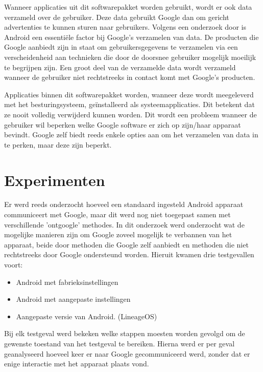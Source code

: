 \documentclass[a0,portrait]{a0poster}
\begin{document}
\begin{multicols}{2}
Wanneer applicaties uit dit softwarepakket worden gebruikt, wordt er ook data verzameld over de gebruiker. Deze data gebruikt Google dan om gericht advertenties te kunnen sturen naar gebruikers. Volgens een onderzoek door \cite{schmidt_google-data-collection} is Android een essentiële factor bij Google's verzamelen van data. De producten die Google aanbiedt zijn in staat om gebruikersgegevens te verzamelen via een verscheidenheid aan technieken die door de doorsnee gebruiker mogelijk moeilijk te begrijpen zijn. Een groot deel van de verzamelde data wordt verzameld wanneer de gebruiker niet rechtstreeks in contact komt met Google's producten. 

Applicaties binnen dit softwarepakket worden, wanneer deze wordt meegeleverd met het besturingsysteem, geïnstalleerd als systeemapplicaties. Dit betekent dat ze nooit volledig verwijderd kunnen worden. Dit wordt een probleem wanneer de gebruiker wil beperken welke Google software er zich op zijn/haar apparaat bevindt. Google zelf biedt reeds enkele opties aan om het verzamelen van data in te perken, maar deze zijn beperkt.

\color{Black} %
\color{HoGentAccent1} 
\section*{Experimenten}
\color{black}
Er werd reeds onderzocht hoeveel een standaard ingesteld Android apparaat communiceert met Google, maar dit werd nog niet toegepast samen met verschillende 'ontgoogle' methodes. In dit onderzoek werd onderzocht wat de mogelijke manieren zijn om Google zoveel mogelijk te verbannen van het apparaat, beide door methoden die Google zelf aanbiedt en methoden die niet rechtstreeks door Google ondersteund worden. Hieruit kwamen drie testgevallen voort: 
\begin{itemize}
    \item Android met fabrieksinstellingen
    \item Android met aangepaste instellingen 
    \item Aangepaste versie van Android. (LineageOS)
\end{itemize}

Bij elk testgeval werd bekeken welke stappen moesten worden gevolgd om de gewenste toestand van het testgeval te bereiken. Hierna werd er per geval geanalyseerd hoeveel keer er naar Google gecommuniceerd werd, zonder dat er enige interactie met het apparaat plaats vond. 


\end{multicols}
\end{document}

